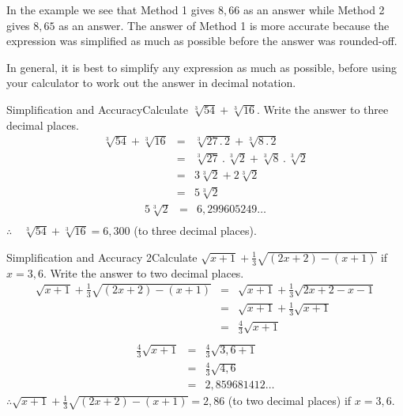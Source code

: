 In the example we see that Method 1 gives $8,66$ as an answer while Method 2 gives $8,65$ as an answer. The answer of Method 1 is more accurate because the expression was simplified as much as possible before the answer was rounded-off.

In general, it is best to simplify any expression as much as possible, before using your calculator to work out the answer in decimal notation.


\begin{wex}{Simplification and Accuracy}{Calculate $\sqrt[3]{54}+\sqrt[3]{16}$. Write the answer to three decimal places.}{
\begin{eqnarray*}
\sqrt[3]{54}+\sqrt[3]{16}&=&\sqrt[3]{27 \,.\, 2}+\sqrt[3]{8 \,.\, 2}\\
&=&\sqrt[3]{27} \,.\, \sqrt[3]{2}+\sqrt[3]{8} \,.\, \sqrt[3]{2}\\
&=&3 \sqrt[3]{2}+2 \sqrt[3]{2}\\
&=&5 \sqrt[3]{2}
\end{eqnarray*}
\begin{eqnarray*}
5 \sqrt[3]{2}&=&6,299605249\ldots\\
\end{eqnarray*}
$\therefore \quad \sqrt[3]{54}+\sqrt[3]{16}=6,300$ (to three decimal places).}
\end{wex}

\begin{wex}{Simplification and Accuracy 2}{Calculate $\sqrt{x+1}+\frac{1}{3}\sqrt{(2x+2)-(x+1)}$ if $x=3,6$. Write the answer to two decimal places.}{
\begin{eqnarray*}
\sqrt{x+1}+\frac{1}{3}\sqrt{(2x+2)-(x+1)}&=&\sqrt{x+1}+\frac{1}{3}\sqrt{2x+2-x-1}\\
&=&\sqrt{x+1}+\frac{1}{3}\sqrt{x+1}\\
&=&\frac{4}{3}\sqrt{x+1}\\
\end{eqnarray*}
\begin{eqnarray*}
\frac{4}{3}\sqrt{x+1}&=&\frac{4}{3}\sqrt{3,6+1}\\
&=&\frac{4}{3}\sqrt{4,6}\\
&=&2,859681412 \ldots
\end{eqnarray*}
$\therefore \sqrt{x+1}+\frac{1}{3}\sqrt{(2x+2)-(x+1)}=2,86$ (to two decimal places) if $x=3,6$.}
\end{wex}

